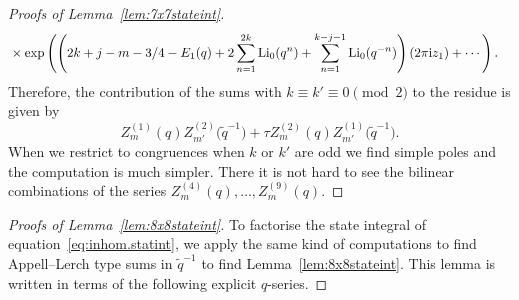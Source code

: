 \documentclass[pdftex]{sigma}
\numberwithin{equation}{section}
\def\tq{\tilde{q}}
\def\Li{\mathrm{Li}}
\def\tq{\tilde{q}}
\def\Li{\operatorname{Li}}
\begin{document}
\begin{proof}[Proofs of Lemma~\ref{lem:7x7stateint}]
\begin{align}
 &\times\exp\left(\left(2k+j-m-3/4-E_1(q)+2\sum_{n=1}^{2k}\Li_{0}(q^{n})+\sum_{n=1}^{k-j-1}\Li_{0}(q^{-n})\right)(2\pi {\rm i}z_{1})+\cdots\right).\nonumber
\end{align}
Therefore, the contribution of the sums with $k\equiv k'\equiv0\pmod{2}$ to the residue is given by
\[
 Z_{m}^{(1)}(q)Z_{m'}^{(2)}\bigl(\tq^{-1}\bigr)+\tau Z_{m}^{(2)}(q)Z_{m'}^{(1)}\bigl(\tq^{-1}\bigr) .
\]
When we restrict to congruences when $k$ or $k'$ are odd we find simple poles and the computation is much simpler. There it is not hard to see the bilinear combinations of the series $Z^{(4)}_m(q),\dots,Z^{(9)}_m(q)$.
\end{proof}

\begin{proof}[Proofs of Lemma~\ref{lem:8x8stateint}]
To factorise the state integral of equation~\eqref{eq:inhom.statint}, we apply the same kind of computations to find Appell--Lerch type sums in $\tq^{-1}$ to find Lemma~\ref{lem:8x8stateint}. This lemma is written in terms of the following explicit $q$-series.


\end{proof}
\end{document}
